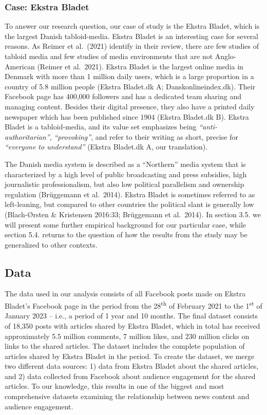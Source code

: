 \documentclass[
]{article}
\begin{document}
\hypertarget{case-ekstra-bladet}{%
\subsubsection{Case: Ekstra Bladet}\label{case-ekstra-bladet}}

\noindent To answer our research question, our case of study is the
Ekstra Bladet, which is the largest Danish tabloid-media. Ekstra Bladet
is an interesting case for several reasons. As Reimer et al.~(2021)
identify in their review, there are few studies of tabloid media and few
studies of media environments that are not Anglo-American (Reimer et
al.~2021). Ekstra Bladet is the largest online media in Denmark with
more than 1 million daily users, which is a large proportion in a
country of 5.8 million people (Ekstra Bladet.dk A; Danskonlineindex.dk).
Their Facebook page has 400,000 followers and has a dedicated team
sharing and managing content. Besides their digital presence, they also
have a printed daily newspaper which has been published since 1904
(Ekstra Bladet.dk B). Ekstra Bladet is a tabloid-media, and its value
set emphasizes being \emph{``anti-authoritarian''},
\emph{``provoking''}, and refer to their writing as short, precise for
\emph{``everyone to understand''} (Ekstra Bladet.dk A, our translation).

The Danish media system is described as a ``Northern'' media system that
is characterized by a high level of public broadcasting and press
subsidies, high journalistic professionalism, but also low political
parallelism and ownership regulation (Brüggemann et al.~2014). Ekstra
Bladet is sometimes referred to as left-leaning, but compared to other
countries the political slant is generally low (Blach-Ørsten \&
Kristensen 2016:33; Brüggemann et al.~2014). In section 3.5. we will
present some further empirical background for our particular case, while
section 5.4. returns to the question of how the results from the study
may be generalized to other contexts.

\hypertarget{data}{%
\subsection{Data}\label{data}}

The data used in our analysis consists of all Facebook posts made on
Ekstra Bladet's Facebook page in the period from the
28\textsuperscript{th} of February 2021 to the 1\textsuperscript{st} of
January 2023 -- i.e., a period of 1 year and 10 months. The final
dataset consists of 18,350 posts with articles shared by Ekstra Bladet,
which in total has received approximately 5.5 million comments, 7
million likes, and 230 million clicks on links to the shared articles.
The dataset includes the complete population of articles shared by
Ekstra Bladet in the period. To create the dataset, we merge two
different data sources: 1) data from Ekstra Bladet about the shared
articles, and 2) data collected from Facebook about audience engagement
for the shared articles. To our knowledge, this results in one of the
biggest and most comprehensive datasets examining the relationship
between news content and audience engagement.
\end{document}
